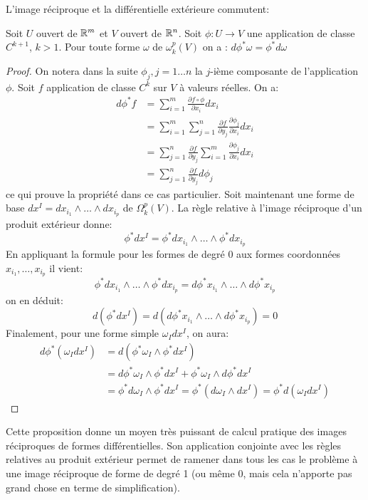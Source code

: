 L'image réciproque et la différentielle extérieure commutent:
\begin{fprop}
Soit $U$ ouvert de $\mathbb{R}^m$ et $V$ ouvert de $\mathbb{R}^n$. Soit $\phi \colon U \to V$ une application de classe $C^{k+1}$, $k > 1$. Pour toute forme $\omega$ de $\omega_k^p(V)$ on a : $d\phi^* \omega = \phi^* d \omega$
\end{fprop}
\begin{proof}
On notera dans la suite $\phi_j, j=1\dots n$ la $j$-ième composante de l'application $\phi$.
Soit $f$ application de classe $C^{k}$ sur $V$ à valeurs réelles. On a:
\begin{align*}
d \phi^* f &= \sum_{i=1}^m \frac{\partial f\circ \phi}{\partial x_i } dx_i \\
 &= \sum_{i=1}^m \sum_{j=1}^n \frac{\partial f }{\partial y_j} \frac{\partial \phi_j}{\partial x_i} dx_i \\
 & = \sum_{j=1}^n \frac{\partial f }{\partial y_j}\sum_{i=1}^m \frac{\partial \phi_j}{\partial x_i} dx_i \\
 & = \sum_{j=1}^n \frac{\partial f }{\partial y_j} d\phi_j
\end{align*}
ce qui prouve la propriété dans ce cas particulier. 
Soit maintenant une forme de base $dx^I= dx_{i_1}\wedge \dots \wedge dx_{i_p}$ de $\Omega_k^p(V)$. La règle relative à l'image réciproque d'un produit extérieur donne:
\[
\phi^* dx^I = \phi^*dx_{i_1}\wedge \dots \wedge \phi^*dx_{i_p}
\]
En appliquant la formule pour les formes de degré 0 aux formes coordonnées $x_{i_1}, \dots,x_{i_p}$ il vient:
\[
\phi^*dx_{i_1}\wedge \dots \wedge \phi^*dx_{i_p} = d \phi^* x_{i_1} \wedge \dots \wedge d\phi^*x_{i_p}
\]
on en déduit:
\[
d(\phi^* dx^I) = d\left(d \phi^* x_{i_1} \wedge \dots \wedge d\phi^*x_{i_p}\right) = 0
\]
Finalement, pour une forme simple $\omega_I dx^I$, on aura:
\begin{align*}
d\phi^*\left(\omega_I dx^I\right) & = d\left(\phi^* \omega_I \wedge \phi^* dx^I \right) \\
&= d\phi^* \omega_I \wedge \phi^* dx^I + \phi^* \omega_I \wedge d \phi^* dx^I  \\
&= \phi^* d \omega_I \wedge \phi^* dx^I = \phi^* \left(d\omega_I \wedge dx^I \right) = \phi^* d\left(\omega_I dx^I\right) 
\end{align*}
\end{proof}
Cette proposition donne un moyen très puissant de calcul pratique des images réciproques de formes différentielles. Son application conjointe avec les règles relatives au produit extérieur permet de ramener dans tous les cas le problème à une image réciproque de forme de degré 1 (ou même 0, mais cela n'apporte pas grand chose en terme de simplification). 
